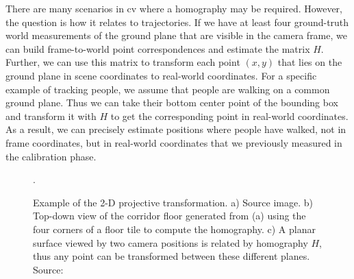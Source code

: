             There are many scenarios in \gls{cv} where a homography may be required. However, the question is how it relates to trajectories. If we have at least four ground-truth world measurements of the ground plane that are visible in the camera frame, we can build frame-to-world point correspondences and estimate the matrix $H$. Further, we can use this matrix to transform each point $(x, y)$ that lies on the ground plane in scene coordinates to real-world coordinates. For a specific example of tracking people, we assume that people are walking on a common ground plane. Thus we can take their bottom center point of the bounding box and transform it with $H$ to get the corresponding point in real-world coordinates. As a result, we can precisely estimate positions where people have walked, not in frame coordinates, but in real-world coordinates that we previously measured in the calibration phase.
            
            \begin{figure}[h]
                \centering
                \qquad
                \qquad
                \caption{Example of the 2-D projective transformation. a) Source image. b) Top-down view of the corridor floor generated from (a) using the four corners of a floor tile to compute the homography. c) A planar surface viewed by two camera positions is related by homography $H$, thus any point can be transformed between these different planes. Source: \cite{hartley2003multiple}}.
                \label{fig:homography_example}
            \end{figure}
  
